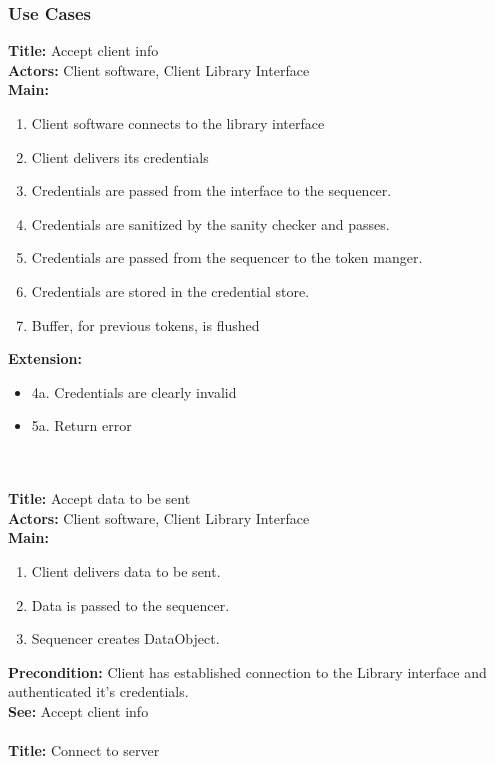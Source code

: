 	\subsubsection{Use Cases}\label{client use cases}
		\textbf{Title:} Accept client info \\
		\textbf{Actors:} Client software, Client Library Interface \\
		\textbf{Main:}
		\begin{enumerate}
			\item Client software connects to the library interface
			\item Client delivers its credentials
			\item Credentials are passed from the interface to the sequencer.
			\item Credentials are sanitized by the sanity checker and passes.
			\item Credentials are passed from the sequencer to the token manger.
			\item Credentials are stored in the credential store.
			\item Buffer, for previous tokens, is flushed
		\end{enumerate}
		\textbf{Extension:} 
		\begin{itemize}
			  \item[] 4a. Credentials are clearly invalid
			  \item[] 5a. Return error
		\end{itemize}
		\\\\
		\textbf{Title:} Accept data to be sent \\
		\textbf{Actors:} Client software, Client Library Interface \\
		\textbf{Main:}
		\begin{enumerate}
			\item Client delivers data to be sent.
			\item Data is passed to the sequencer.
			\item Sequencer creates DataObject.
		\end{enumerate}
		\textbf{Precondition:} Client has established connection to the Library interface and authenticated it's credentials. \\
		\textbf{See:} Accept client info
		\\\\
		\textbf{Title:} Connect to server \\
